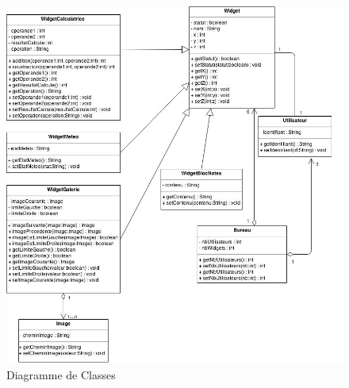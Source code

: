 \begin{figure}[H]
	\centering
	\includegraphics[angle=90,scale=0.5]{diagrammes/DC.jpg}
	\caption{Diagramme de Classes}
\end{figure}